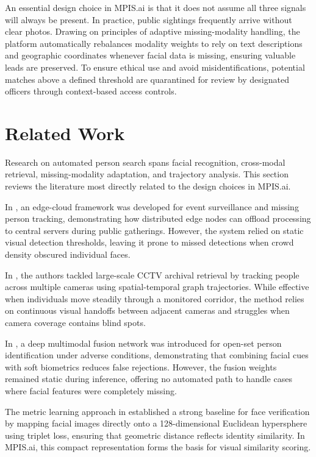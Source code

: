 \documentclass[conference]{IEEEtran}
\begin{document}
An essential design choice in MPIS.ai is that it does not assume all three signals will always be present. In practice, public sightings frequently arrive without clear photos. Drawing on principles of adaptive missing-modality handling, the platform automatically rebalances modality weights to rely on text descriptions and geographic coordinates whenever facial data is missing, ensuring valuable leads are preserved. To ensure ethical use and avoid misidentifications, potential matches above a defined threshold are quarantined for review by designated officers through context-based access controls.

\section{Related Work}
Research on automated person search spans facial recognition, cross-modal retrieval, missing-modality adaptation, and trajectory analysis. This section reviews the literature most directly related to the design choices in MPIS.ai.

In \cite{ref_base_paper}, an edge-cloud framework was developed for event surveillance and missing person tracking, demonstrating how distributed edge nodes can offload processing to central servers during public gatherings. However, the system relied on static visual detection thresholds, leaving it prone to missed detections when crowd density obscured individual faces.

In \cite{ref_crowdscan}, the authors tackled large-scale CCTV archival retrieval by tracking people across multiple cameras using spatial-temporal graph trajectories. While effective when individuals move steadily through a monitored corridor, the method relies on continuous visual handoffs between adjacent cameras and struggles when camera coverage contains blind spots.

In \cite{ref_deep_multimodal}, a deep multimodal fusion network was introduced for open-set person identification under adverse conditions, demonstrating that combining facial cues with soft biometrics reduces false rejections. However, the fusion weights remained static during inference, offering no automated path to handle cases where facial features were completely missing.

The metric learning approach in \cite{ref_facenet} established a strong baseline for face verification by mapping facial images directly onto a 128-dimensional Euclidean hypersphere using triplet loss, ensuring that geometric distance reflects identity similarity. In MPIS.ai, this compact representation forms the basis for visual similarity scoring.
\end{document}
